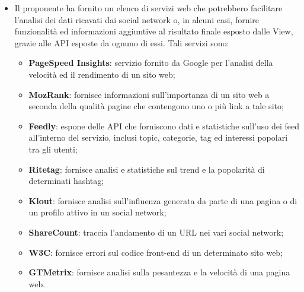 \begin{itemize}
  \item Il proponente ha fornito un elenco di servizi web che potrebbero facilitare l'analisi dei dati
  ricavati dai social network o, in alcuni casi, fornire funzionalità ed informazioni aggiuntive al
  risultato finale esposto dalle View, grazie alle API esposte da ognuno di essi. Tali servizi sono:
  \begin{itemize}
    \item \textbf{PageSpeed Insights}: servizio fornito da Google per l'analisi della velocità ed il
    rendimento di un sito web;
    \item \textbf{MozRank}: fornisce informazioni sull'importanza di un sito web a seconda della qualità
    pagine che contengono uno o più link a tale sito;
    \item \textbf{Feedly}: espone delle API che forniscono dati e statistiche sull'uso dei feed all'interno
    del servizio, inclusi topic, categorie, tag ed interessi popolari tra gli utenti;
    \item \textbf{Ritetag}: fornisce analisi e statistiche sul trend e la popolarità di determinati hashtag;
    \item \textbf{Klout}: fornisce analisi sull'influenza generata da parte di una pagina o di un profilo
    attivo in un social network;
    \item \textbf{ShareCount}: traccia l'andamento di un URL nei vari social network;
    \item \textbf{W3C}: fornisce errori sul codice front-end di un determinato sito web;
    \item \textbf{GTMetrix}: fornisce analisi sulla pesantezza e la velocità di una pagina web.
  \end{itemize}
\end{itemize}
